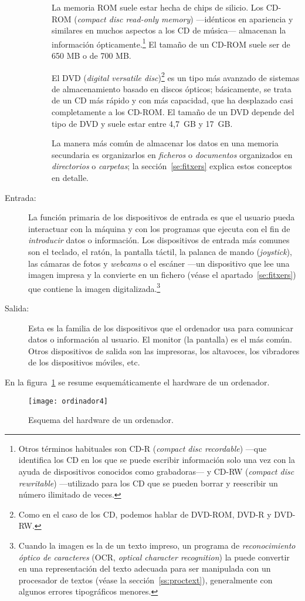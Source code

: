 \begin{description}
\begin{description}
La memoria ROM suele estar hecha de chips de silicio. Los CD-ROM (\emph{compact disc read-only memory}) ---idénticos en apariencia y similares en muchos aspectos a los CD de música--- almacenan la información ópticamente.\footnote{Otros términos habituales son CD-R (\emph{compact disc recordable}) ---que identifica los CD en los que se puede escribir información solo una vez con la ayuda de dispositivos conocidos como grabadoras--- y CD-RW (\emph{compact disc rewritable}) ---utilizado para los CD que se pueden borrar y reescribir un número ilimitado de veces.} El tamaño de un CD-ROM suele ser de 650 MB o de 700 MB. 

El DVD (\emph{digital versatile disc})\footnote{Como en el caso de los CD, podemos hablar de DVD-ROM, DVD-R y DVD-RW.} es un tipo más avanzado de sistemas de almacenamiento basado en discos ópticos; básicamente, se trata de un CD más rápido y con más capacidad, que ha desplazado casi completamente a los CD-ROM. El tamaño de un DVD depende del tipo de DVD y suele estar entre 4,7~GB y 17~GB. 

La manera más común de almacenar los datos en una memoria secundaria es organizarlos en {\em ficheros} o \emph{documentos} organizados en \emph{directorios} o \emph{carpetas}; la sección~\ref{se:fitxers} explica estos conceptos en detalle.\label{pg:menciofitxer} \end{description} 

\item[Entrada:] La función primaria de los dispositivos de entrada es que el usuario pueda interactuar con la máquina y con los programas que ejecuta con el fin de \emph{introducir} datos o información. Los dispositivos de entrada más comunes son el teclado, el ratón, la pantalla táctil, la palanca de mando (\emph{joystick}), las cámaras de fotos y \emph{webcams} o el escáner ---un dispositivo que lee una imagen impresa y la convierte en un fichero (véase el apartado~\ref{se:fitxers}) que contiene la imagen digitalizada.\footnote{Cuando la imagen es la de un texto impreso, un programa de \emph{reconocimiento óptico de caracteres} (OCR, \emph{optical character recognition}) la puede convertir en una representación del texto adecuada para ser manipulada con un procesador de textos (véase la sección~\ref{ss:proctext}), generalmente con algunos errores tipográficos menores.} 

\item[Salida:] Esta es la familia de los dispositivos que el ordenador usa para comunicar datos o información al usuario. El monitor (la pantalla) es el más común. Otros dispositivos de salida son las impresoras, los altavoces, los vibradores de los dispositivos móviles, etc. 

\end{description} En la figura~\ref{fg:ordinador} se resume esquemáticamente el hardware de un ordenador. \begin{figure} \centering

\texttt{[image: ordinador4]} \caption{Esquema del hardware de un ordenador.} \label{fg:ordinador} \end{figure} 

